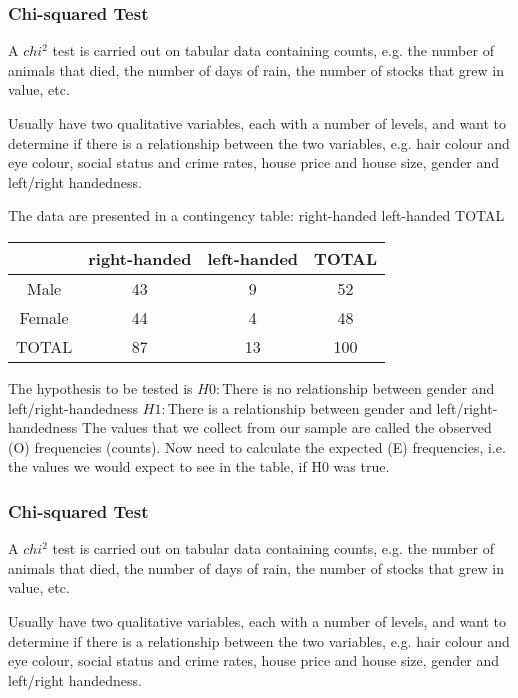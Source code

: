 \subsubsection{Chi-squared Test}

A $chi^2$ test is carried out on tabular data containing counts, e.g. the
number of animals that died, the number of days of rain, the
number of stocks that grew in value, etc.

Usually have two qualitative variables, each with a number of
levels, and want to determine if there is a relationship between the
two variables, e.g. hair colour and eye colour, social status and
crime rates, house price and house size, gender and left/right
handedness.

The data are presented in a contingency table:
right-handed left-handed TOTAL

\begin{tabular}{|c|c|c|c|}
	\hline
	& right-handed &left-handed & TOTAL\\\hline
	Male & 43 & 9 & 52 \\
	Female & 44 & 4 & 48 \\
	TOTAL & 87 & 13 & 100 \\
	\hline
\end{tabular}


The hypothesis to be tested is
$H0 :$There is no relationship between gender and left/right-handedness
$H1 :$There is a relationship between gender and left/right-handedness
The values that we collect from our sample are called the observed
(O) frequencies (counts). Now need to calculate the expected (E)
frequencies, i.e. the values we would expect to see in the table, if
H0 was true.








\subsubsection{Chi-squared Test}

A $chi^2$ test is carried out on tabular data containing counts, e.g. the
number of animals that died, the number of days of rain, the
number of stocks that grew in value, etc.

Usually have two qualitative variables, each with a number of
levels, and want to determine if there is a relationship between the
two variables, e.g. hair colour and eye colour, social status and
crime rates, house price and house size, gender and left/right
handedness.

